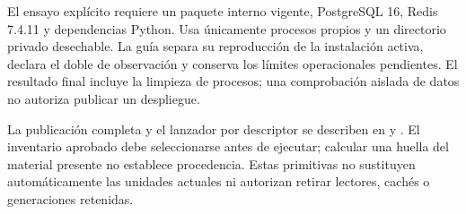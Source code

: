 El ensayo explícito  requiere
un paquete interno vigente, PostgreSQL 16, Redis 7.4.11 y dependencias Python.
Usa únicamente procesos propios y un directorio privado desechable. La guía
 separa su reproducción de la
instalación activa, declara el doble de observación y conserva los límites
operacionales pendientes. El resultado final incluye la limpieza de procesos;
una comprobación aislada de datos no autoriza publicar un despliegue.

La publicación completa y el lanzador por descriptor se describen en
 y
. El inventario aprobado debe
seleccionarse antes de ejecutar; calcular una huella del material presente no
establece procedencia. Estas primitivas no sustituyen automáticamente las
unidades actuales ni autorizan retirar lectores, cachés o generaciones retenidas.
